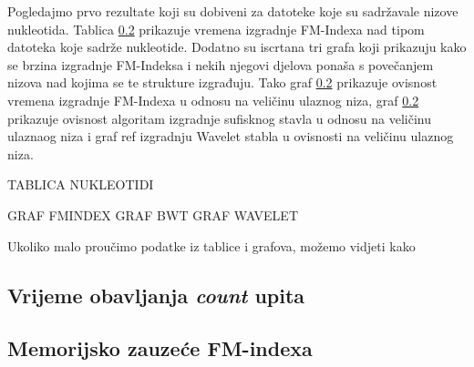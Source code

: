 Pogledajmo prvo rezultate koji su dobiveni za datoteke koje su sadržavale nizove nukleotida. Tablica \ref{} prikazuje vremena izgradnje FM-Indexa nad tipom datoteka koje sadrže nukleotide. Dodatno su iscrtana tri grafa koji prikazuju kako se brzina izgradnje FM-Indeksa i nekih njegovi djelova ponaša s povečanjem nizova nad kojima se te strukture izgrađuju. Tako graf \ref{} prikazuje ovisnost vremena izgradnje FM-Indexa u odnosu na veličinu ulaznog niza, graf \ref{} prikazuje ovisnost algoritam izgradnje sufisknog stavla u odnosu na veličinu ulaznaog niza i graf ref{} izgradnju Wavelet stabla u ovisnosti na veličinu ulaznog niza.

TABLICA NUKLEOTIDI

GRAF FMINDEX
GRAF BWT
GRAF WAVELET


Ukoliko malo proučimo podatke iz tablice i grafova, možemo vidjeti kako 




\subsection{Vrijeme obavljanja \textit{count} upita}

\subsection{Memorijsko zauzeće FM-indexa}